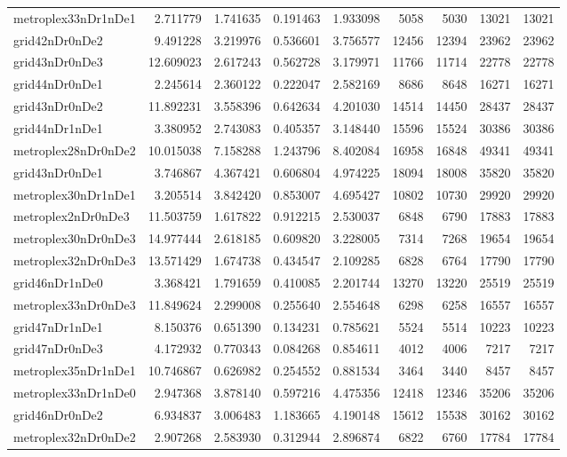 \begin{longtable}{|l|r|r|r|r|r|r|r|r|}
metroplex33nDr1nDe1 & 2.711779 & 1.741635 & 0.191463 & 1.933098 & 5058 & 5030 & 13021 & 13021 \\
grid42nDr0nDe2 & 9.491228 & 3.219976 & 0.536601 & 3.756577 & 12456 & 12394 & 23962 & 23962 \\
grid43nDr0nDe3 & 12.609023 & 2.617243 & 0.562728 & 3.179971 & 11766 & 11714 & 22778 & 22778 \\
grid44nDr0nDe1 & 2.245614 & 2.360122 & 0.222047 & 2.582169 & 8686 & 8648 & 16271 & 16271 \\
grid43nDr0nDe2 & 11.892231 & 3.558396 & 0.642634 & 4.201030 & 14514 & 14450 & 28437 & 28437 \\
grid44nDr1nDe1 & 3.380952 & 2.743083 & 0.405357 & 3.148440 & 15596 & 15524 & 30386 & 30386 \\
metroplex28nDr0nDe2 & 10.015038 & 7.158288 & 1.243796 & 8.402084 & 16958 & 16848 & 49341 & 49341 \\
grid43nDr0nDe1 & 3.746867 & 4.367421 & 0.606804 & 4.974225 & 18094 & 18008 & 35820 & 35820 \\
metroplex30nDr1nDe1 & 3.205514 & 3.842420 & 0.853007 & 4.695427 & 10802 & 10730 & 29920 & 29920 \\
metroplex2nDr0nDe3 & 11.503759 & 1.617822 & 0.912215 & 2.530037 & 6848 & 6790 & 17883 & 17883 \\
metroplex30nDr0nDe3 & 14.977444 & 2.618185 & 0.609820 & 3.228005 & 7314 & 7268 & 19654 & 19654 \\
metroplex32nDr0nDe3 & 13.571429 & 1.674738 & 0.434547 & 2.109285 & 6828 & 6764 & 17790 & 17790 \\
grid46nDr1nDe0 & 3.368421 & 1.791659 & 0.410085 & 2.201744 & 13270 & 13220 & 25519 & 25519 \\
metroplex33nDr0nDe3 & 11.849624 & 2.299008 & 0.255640 & 2.554648 & 6298 & 6258 & 16557 & 16557 \\
grid47nDr1nDe1 & 8.150376 & 0.651390 & 0.134231 & 0.785621 & 5524 & 5514 & 10223 & 10223 \\
grid47nDr0nDe3 & 4.172932 & 0.770343 & 0.084268 & 0.854611 & 4012 & 4006 & 7217 & 7217 \\
metroplex35nDr1nDe1 & 10.746867 & 0.626982 & 0.254552 & 0.881534 & 3464 & 3440 & 8457 & 8457 \\
metroplex33nDr1nDe0 & 2.947368 & 3.878140 & 0.597216 & 4.475356 & 12418 & 12346 & 35206 & 35206 \\
grid46nDr0nDe2 & 6.934837 & 3.006483 & 1.183665 & 4.190148 & 15612 & 15538 & 30162 & 30162 \\
metroplex32nDr0nDe2 & 2.907268 & 2.583930 & 0.312944 & 2.896874 & 6822 & 6760 & 17784 & 17784 \\

\end{longtable}
